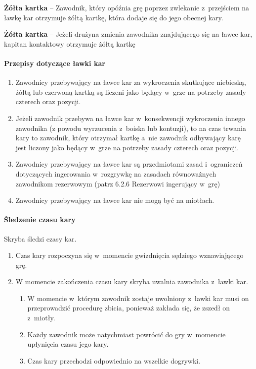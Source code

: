 \documentclass[12pt,a4paper]{article}
\newcommand\yellowcard[1]{\bgroup\textcolor{darkyellow}{\textbf{#1}}}
\begin{document}
\yellowcard{Żółta kartka} -- Zawodnik, który opóźnia grę poprzez zwlekanie z~przejściem na ławkę kar otrzymuje żółtą kartkę, która dodaje się do jego
obecnej kary.

\yellowcard{Żółta kartka} -- Jeżeli drużyna zmienia zawodnika znajdującego się
na ławce kar, kapitan kontaktowy otrzymuje żółtą kartkę

\paragraph{Przepisy dotyczące ławki kar}

\begin{enumerate}
	\item
	      Zawodnicy przebywający na ławce kar za wykroczenia skutkujące
	      niebieską, żółtą lub czerwoną kartką są liczeni jako będący w~grze na
	      potrzeby zasady czterech oraz pozycji.
	\item
	      Jeżeli zawodnik przebywa na ławce kar w~konsekwencji wykroczenia
	      innego zawodnika (z powodu wyrzucenia z~boiska lub kontuzji), to na
	      czas trwania kary to zawodnik, który otrzymał kartkę a~nie zawodnik
	      odbywający karę jest liczony jako będący w~grze na potrzeby zasady
	      czterech oraz pozycji.
	\item
	      Zawodnicy przebywający na ławce kar są przedmiotami zasad i~ograniczeń
	      dotyczących ingerowania w~rozgrywkę na zasadach równoważnych
	      zawodnikom rezerwowym (patrz 6.2.6 Rezerwowi ingerujący w~grę)
	\item
	      Zawodnicy przebywający na ławce kar nie mogą być na miotłach.
\end{enumerate}

\paragraph{Śledzenie czasu kary}
Skryba śledzi czasy kar.

\begin{enumerate}
	\item
	      Czas kary rozpoczyna się w~momencie gwizdnięcia sędziego wznawiającego
	      grę.
	\item
	      W momencie zakończenia czasu kary skryba uwalnia zawodnika z~ławki
	      kar.

	      \begin{enumerate}
		      \item
		            W momencie w~którym zawodnik zostaje uwolniony z~ławki kar musi on
		            przeprowadzić procedurę zbicia, ponieważ zakłada się, że zszedł on z~miotły.
		      \item
		            Każdy zawodnik może natychmiast powrócić do gry w~momencie
		            upłynięcia czasu jego kary.
		      \item
		            Czas kary przechodzi odpowiednio na wszelkie dogrywki.
	      \end{enumerate}
\end{enumerate}
\end{document}
